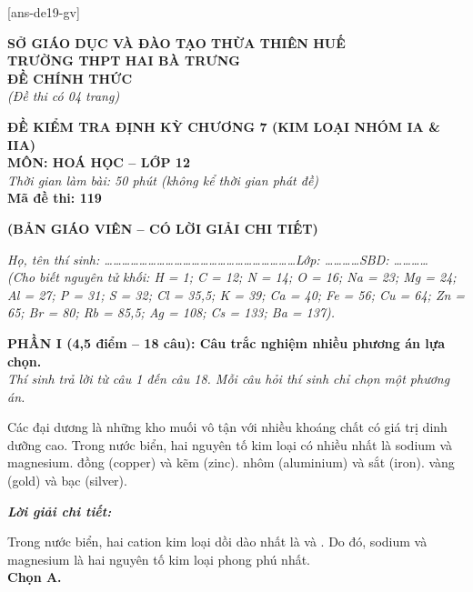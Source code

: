 \documentclass[11pt,a4paper]{article}
\def\loigiai#1{
\par\begingroup\color{blue!80!black}\small
\noindent\textbf{\textit{Lời giải chi tiết:}}\par
#1\par\endgroup}
\begin{document}
[ans-de19-gv]

\noindent
\begin{minipage}[t]{0.48\textwidth}
	\textbf{SỞ GIÁO DỤC VÀ ĐÀO TẠO THỪA THIÊN HUẾ}\\
	\textbf{TRƯỜNG THPT HAI BÀ TRƯNG}\\
	\textbf{ĐỀ CHÍNH THỨC}\\
	\textit{(Đề thi có 04 trang)}
\end{minipage}\hfill
\begin{minipage}[t]{0.48\textwidth}
	\raggedleft
	\textbf{\color{mainGreen}ĐỀ KIỂM TRA ĐỊNH KỲ CHƯƠNG 7 (KIM LOẠI NHÓM IA \& IIA)}\\
	\textbf{MÔN: HOÁ HỌC -- LỚP 12}\\
	\textit{Thời gian làm bài: 50 phút (không kể thời gian phát đề)}\\
	\textbf{Mã đề thi: 119}
\end{minipage}


\vspace{0.1cm}
\begin{center}
	\textbf{\color{hfRed}\Large (BẢN GIÁO VIÊN -- CÓ LỜI GIẢI CHI TIẾT)}
\end{center}

\vspace{1pt}
\noindent\textit{Họ, tên thí sinh: \dots\dots\dots\dots\dots\dots\dots\dots\dots\dots\dots\dots\dots\dots\dots\dots\dots\dots\dots\dots\dots\dots Lớp: \dots\dots\dots\dots SBD: \dots\dots\dots\dots}\\
\noindent\textit{(Cho biết nguyên tử khối: H = 1; C = 12; N = 14; O = 16; Na = 23; Mg = 24; Al = 27; P = 31; S = 32; Cl = 35,5; K = 39; Ca = 40; Fe = 56; Cu = 64; Zn = 65; Br = 80; Rb = 85,5; Ag = 108; Cs = 133; Ba = 137).}

\vspace{1pt}
\noindent
\textbf{PHẦN I (4,5 điểm -- 18 câu): Câu trắc nghiệm nhiều phương án lựa chọn.}\\
\textit{Thí sinh trả lời từ câu 1 đến câu 18. Mỗi câu hỏi thí sinh chỉ chọn một phương án.}

\begin{ex}
Các đại dương là những kho muối vô tận với nhiều khoáng chất có giá trị dinh dưỡng cao. Trong nước biển, hai nguyên tố kim loại có nhiều nhất là
\choice
{\True sodium và magnesium.}
{đồng (copper) và kẽm (zinc).}
{nhôm (aluminium) và sắt (iron).}
{vàng (gold) và bạc (silver).}
\loigiai{
Trong nước biển, hai cation kim loại dồi dào nhất là \ce{Na+} và \ce{Mg^2+}. Do đó, sodium và magnesium là hai nguyên tố kim loại phong phú nhất.\\
\textbf{Chọn A.}}
\end{ex}
\end{document}
